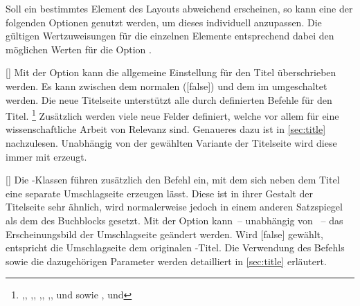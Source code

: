 Soll ein bestimmtes Element des Layouts abweichend erscheinen, so kann eine der 
folgenden Optionen genutzt werden, um dieses individuell anzupassen. Die 
gültigen Wertzuweisungen für die einzelnen Elemente entsprechend dabei den 
möglichen Werten für die Option .

\begin{Declaration}{[\PSet]}
\printdeclarationlist%
%
%
Mit der Option  kann die allgemeine Einstellung für den Titel 
überschrieben werden. Es kann zwischen dem normalen ([false]) 
und dem im \CD umgeschaltet werden. Die neue Titelseite unterstützt alle durch 
\KOMAScript{} definierten Befehle für den Titel.%
\footnote{\raggedright%
  ,,
  ,,
  ,,
  ,,
   und  sowie
  ,
  und 
}
Zusätzlich werden viele neue Felder definiert, welche vor allem für eine 
wissenschaftliche Arbeit von Relevanz sind. Genaueres dazu 
ist in \autoref{sec:title} nachzulesen. Unabhängig von der gewählten Variante 
der Titelseite wird diese immer mit  erzeugt.
\end{Declaration}

\begin{Declaration}{[\PSet]}
\printdeclarationlist%
%
%
Die \TUDScript-Klassen führen zusätzlich den Befehl  ein, mit 
dem sich neben dem Titel eine separate Umschlagseite erzeugen lässt. Diese ist 
in ihrer Gestalt der Titelseite sehr ähnlich, wird normalerweise jedoch in 
einem anderen Satzspiegel als dem des Buchblocks gesetzt. Mit der Option 
 kann~-- unabhängig von ~-- das Erscheinungsbild 
der Umschlagseite geändert werden. Wird [false] gewählt, 
entspricht die Umschlagseite dem originalen \KOMAScript-Titel. Die Verwendung 
des Befehls  sowie die dazugehörigen Parameter werden 
detailliert in \autoref{sec:title} erläutert.
\end{Declaration}

